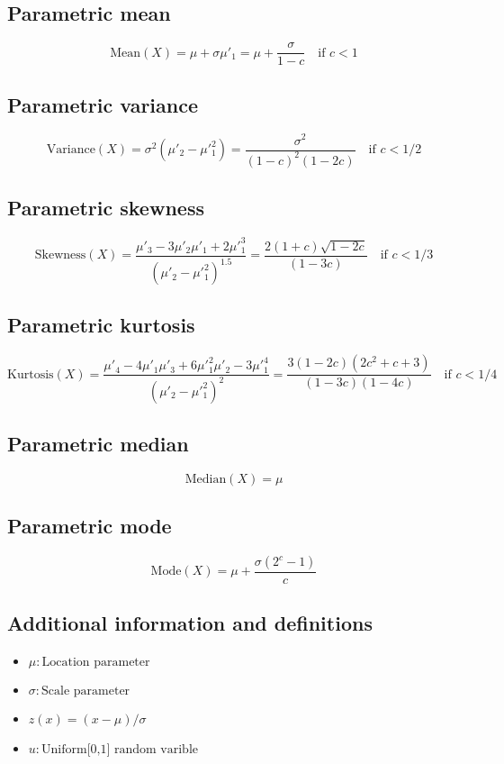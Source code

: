 \documentclass{article}
\begin{document}
\subsection{Parametric mean}
\begin{equation*} \mathrm{Mean}(X)=\mu+\sigma\mu'_{1}=\mu+\frac{\sigma}{1-c} \quad \text{if } c<1 \end{equation*}
\subsection{Parametric variance}
\begin{equation*} \mathrm{Variance}(X)=\sigma^2(\mu'_{2}-\mu'^{2}_{1})=\frac{\sigma^2}{(1-c)^2(1-2c)} \quad \text{if } c<1/2 \end{equation*}
\subsection{Parametric skewness}
\begin{equation*} \mathrm{Skewness}(X)=\frac{\mu'_{3}-3\mu'_{2}\mu'_{1}+2\mu'^{3}_{1}}{(\mu'_{2}-\mu'^{2}_{1})^{1.5}}=\frac{2(1+c)\sqrt{1-2c}}{(1-3c)} \quad \text{if } c<1/3 \end{equation*}
\subsection{Parametric kurtosis}
\begin{equation*} \mathrm{Kurtosis}(X)=\frac{\mu'_{4}-4\mu'_{1}\mu'_{3}+6\mu'^{2}_{1}\mu'_{2}-3\mu'^{4}_{1}}{(\mu'_{2}-\mu'^{2}_{1})^{2}}=\frac{3(1-2c)(2c^2+c+3)}{(1-3c)(1-4c)} \quad \text{if } c<1/4 \end{equation*}
\subsection{Parametric median}
\begin{equation*} \mathrm{Median}(X)=\mu \end{equation*}
\subsection{Parametric mode}
\begin{equation*} \mathrm{Mode}(X)=\mu+\frac{\sigma( 2^{c} -1)}{c} \end{equation*}
\subsection{Additional information and definitions}
\begin{itemize}
    \item $ \mu:\text{Location parameter} $
    \item $ \sigma:\text{Scale parameter} $
    \item $ z\left(x\right)=\left(x-\mu\right)/\sigma $
    \item $ u:\text{Uniform[0,1] random varible} $
\end{itemize}
\end{document}
